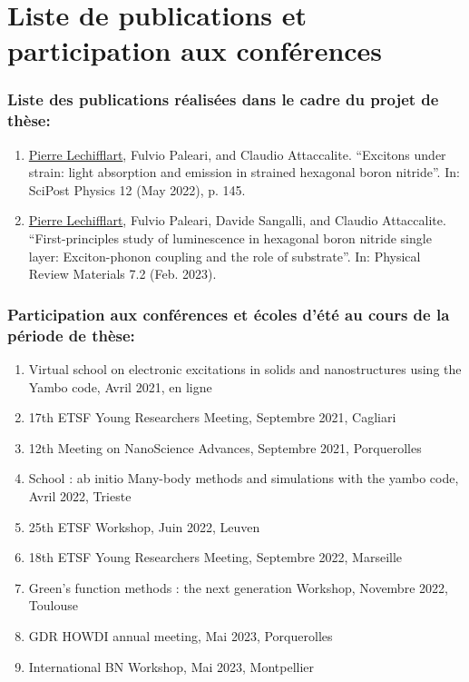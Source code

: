 \newpage
\chapter*{Liste de publications et participation aux conférences}
\subsection*{Liste des publications réalisées dans le cadre du projet de thèse:}
\begin{enumerate}
\item \underline{Pierre Lechifflart}, Fulvio Paleari, and Claudio Attaccalite. “Excitons under strain: light absorption and emission in strained
hexagonal boron nitride”. In: SciPost Physics 12 (May 2022), p. 145.
\item \underline{Pierre Lechifflart}, Fulvio Paleari, Davide Sangalli, and Claudio Attaccalite. “First-principles study of luminescence in hexagonal boron
nitride single layer: Exciton-phonon coupling and the role of substrate”. In: Physical Review Materials 7.2 (Feb. 2023).
\end{enumerate}


\subsection*{Participation aux conférences et écoles d’été au cours de la période de thèse:}
\begin{enumerate}
\item Virtual school on electronic excitations in solids and nanostructures using the Yambo code, Avril 2021, en ligne
\item 17th ETSF Young Researchers Meeting, Septembre 2021, Cagliari
\item 12th Meeting on NanoScience Advances, Septembre 2021, Porquerolles
\item School : ab initio Many-body methods and simulations with the yambo code, Avril 2022, Trieste  
\item 25th ETSF Workshop, Juin 2022, Leuven
\item 18th ETSF Young Researchers Meeting, Septembre 2022, Marseille
\item Green's function methods : the next generation Workshop, Novembre 2022, Toulouse
\item GDR HOWDI annual meeting, Mai 2023, Porquerolles
\item International BN Workshop, Mai 2023, Montpellier
\end{enumerate}